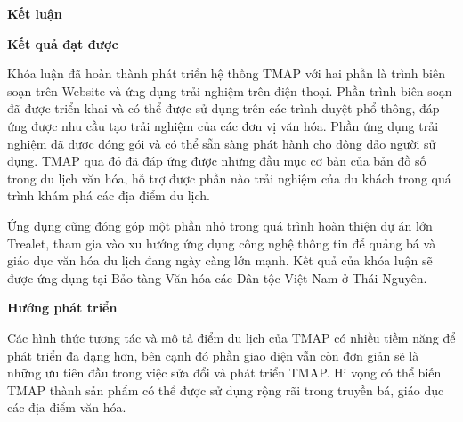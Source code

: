 \begin{center}
\textbf{\large{Kết luận}	}
\end{center}

\textbf{Kết quả đạt được}

Khóa luận đã hoàn thành phát triển hệ thống TMAP với
hai phần là trình biên soạn trên Website và ứng dụng trải nghiệm trên điện thoại. Phần
trình biên soạn đã được triển khai và có thể được sử dụng trên các trình duyệt phổ
thông, đáp ứng được nhu cầu tạo trải nghiệm của các đơn vị văn hóa. Phần ứng dụng
trải nghiệm đã được đóng gói và có thể sẵn sàng phát hành cho đông đảo người sử
dụng. TMAP qua đó đã đáp ứng được những đầu mục cơ bản của bản đồ số trong du
lịch văn hóa, hỗ trợ được phần nào trải nghiệm của du khách trong quá trình khám
phá các địa điểm du lịch.

Ứng dụng cũng đóng góp một phần nhỏ trong quá trình hoàn thiện dự án lớn
Trealet, tham gia vào xu hướng ứng dụng công nghệ thông tin để quảng bá và giáo
dục văn hóa du lịch đang ngày càng lớn mạnh. Kết quả của khóa luận sẽ được ứng
dụng tại Bảo tàng Văn hóa các Dân tộc Việt Nam ở Thái Nguyên.

\textbf{Hướng phát triển}

Các hình thức tương tác và mô tả điểm du lịch của TMAP
có nhiều tiềm năng để phát triển đa dạng hơn, bên cạnh đó phần giao diện vẫn còn
đơn giản sẽ là những ưu tiên đầu trong việc sửa đổi và phát triển TMAP. Hi vọng có thể biến TMAP thành sản
phẩm có thể được sử dụng rộng rãi trong truyền bá, giáo dục các địa điểm văn hóa.
